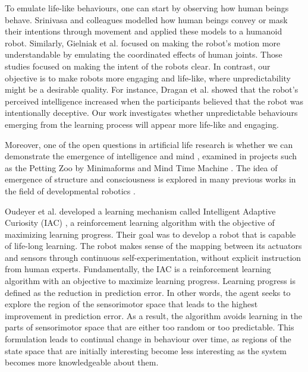 To emulate life-like behaviours, one can start by observing how human beings behave. Srinivasa and colleagues \cite{Dragan2015}\cite{AncaDraga2014} modelled how human beings convey or mask their intentions through movement and applied these models to a humanoid robot. Similarly, Gielniak et al. \cite{Gielniak2013} focused on making the robot's motion more understandable by emulating the coordinated effects of human joints. Those studies focused on making the intent of the robots clear. In contrast, our objective is to make robots more engaging and life-like, where unpredictability might be a desirable quality. For instance, Dragan et al. \cite{AncaDraga2014} showed that the robot's perceived intelligence increased when the participants believed that the robot was intentionally deceptive. Our work investigates whether unpredictable behaviours emerging from the learning process will appear more life-like and engaging.

Moreover, one of the open questions in artificial life research is whether we can demonstrate the emergence of intelligence and mind \cite{Bedau2000}, examined in projects such as the Petting Zoo by Minimaforms \cite{Minimaforms} and Mind Time Machine \cite{Ikegami2013}. The idea of emergence of structure and consciousness is explored in many previous works in the field of developmental robotics \cite{Lungarella2003}\cite{Asada2009}\cite{Kompella2014}. %

Oudeyer et al. developed a learning mechanism called Intelligent Adaptive Curiosity (IAC) \cite{Oudeyer2007}, a reinforcement learning algorithm with the objective of maximizing learning progress. Their goal 
was to develop a robot that is capable of life-long learning. The robot makes sense of the mapping between its actuators and sensors through continuous self-experimentation, without explicit instruction from human experts. Fundamentally, the IAC is a reinforcement learning algorithm with an objective to maximize learning progress. Learning progress is defined as the reduction in prediction error. In other words, the agent seeks to explore the region of the sensorimotor space that leads to the highest improvement in prediction error. As a result, the algorithm avoids learning in the parts of sensorimotor space that are either too random or too predictable. This formulation leads to continual change in behaviour over time, as regions of the state space that are initially interesting become less interesting as the system becomes more knowledgeable about them. 

